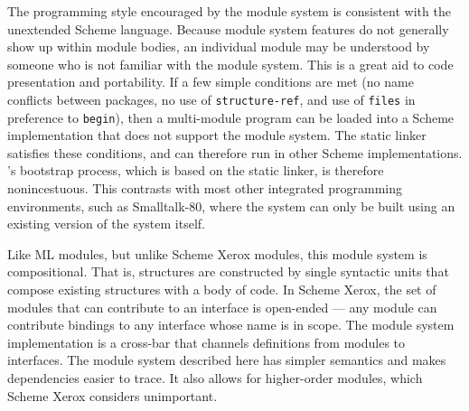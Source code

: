 The programming style encouraged by the module system is consistent
with the unextended Scheme language.  Because module system features
do not generally show up within module bodies, an individual module
may be understood by someone who is not familiar with the module
system.  This is a great aid to code presentation and portability.  If
a few simple conditions are met (no name conflicts between packages,
no use of {\tt structure-ref}, and use of {\tt files} in preference to
{\tt begin}), then a multi-module program can be loaded into a Scheme
implementation that does not support the module system.  The \hack{}
static linker satisfies these conditions, and can therefore run in
other Scheme implementations.  \hack{}'s bootstrap process, which is
based on the static linker, is therefore nonincestuous.  This
contrasts with most other integrated programming environments, such as
Smalltalk-80, where the system can only be built using an existing
version of the system itself.

Like ML modules, but unlike Scheme Xerox modules, this module system
is compositional.  That is, structures are constructed by single
syntactic units that compose existing structures with a body of code.
In Scheme Xerox, the set of modules that can contribute to an
interface is open-ended --- any module can contribute bindings to any
interface whose name is in scope.  The module system implementation is
a cross-bar that channels definitions from modules to interfaces.  The
module system described here has simpler semantics and makes
dependencies easier to trace.  It also allows for higher-order
modules, which Scheme Xerox considers unimportant.

%
%


